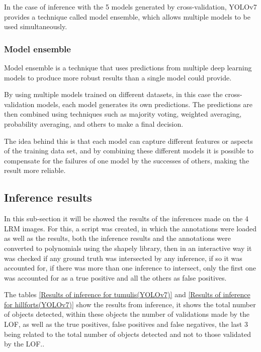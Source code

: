 In the case of inference with the 5 models generated by cross-validation, YOLOv7 provides a technique called model ensemble, which allows multiple models to be used simultaneously.

\subsubsection{Model ensemble}
Model ensemble is a technique that uses predictions from multiple deep learning models to produce more robust results than a single model could provide.

By using multiple models trained on different datasets, in this case the cross-validation models, each model generates its own predictions. The predictions are then combined using techniques such as majority voting, weighted averaging, probability averaging, and others to make a final decision.

The idea behind this is that each model can capture different features or aspects of the training data set, and by combining these different models it is possible to compensate for the failures of one model by the successes of others, making the result more reliable.



\subsection{Inference results}
In this sub-section it will be showed the results of the inferences made on the 4 LRM images. For this, a script was created, in which the annotations were loaded as well as the results, both the inference results and the annotations were converted to polynomials using the shapely library, then in an interactive way it was checked if any ground truth was intersected by any inference, if so it was accounted for, if there was more than one inference to intersect, only the first one was accounted for as a true positive and all the others as false positives.

The tables \ref{Results of inference for tumulis(YOLOv7)} and \ref{Results of inference for hillforts(YOLOv7)} show the results from inference, it shows the total number of objects detected, within these objects the number of validations made by the LOF, as well as the true positives, false positives and false negatives, the last 3 being related to the total number of objects detected and not to those validated by the LOF..

